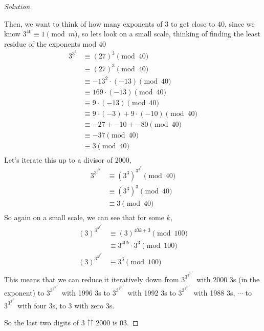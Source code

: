 \documentclass[11pt]{article}
\newenvironment{solution}
  {\renewcommand\qedsymbol{$~$}\begin{proof}[Solution]$ $\par\nobreak\ignorespaces}
  {\end{proof}}
\begin{document}
\begin{solution}
    Then, we want to think of how many exponents of 3 to get close to 40, since we know $3^{40} \equiv 1 \pmod{m}$, so lets look on a small scale, thinking of finding the least residue of the exponents mod 40
    \begin{align*}
        3^{3^3} & \equiv (27)^3 \pmod{40}                        \\
                & \equiv (27)^3 \pmod{40}                        \\
                & \equiv -13^2 \cdot (-13 )\pmod{40}             \\
                & \equiv 169 \cdot (-13) \pmod{40}               \\
                & \equiv 9 \cdot( -13) \pmod{40}                 \\
                & \equiv 9 \cdot (-3) + 9 \cdot (-10) \pmod {40} \\
                & \equiv -27 + -10 + -80 \pmod{40}               \\
                & \equiv -37 \pmod{40}                           \\
                & \equiv 3 \pmod{40}                             \\
    \end{align*}
    Let's iterate this up to a divisor of 2000,
    \begin{align*}
        3^{3^{3^{3^{3}}}} & \equiv (3^3)^{3^{3^3}} \pmod{40} \\
                          & \equiv (3^3)^3 \pmod{40}         \\
                          & \equiv 3 \pmod{40}               \\
    \end{align*}
    So again on a small scale, we can see that for some $k$,
    \begin{align*}
        (3)^{3^{3^{3^{3^3}}}} & \equiv (3)^{40k + 3} \pmod{100}     \\
                              & \equiv 3^{40k} \cdot 3^3 \pmod{100} \\
        (3)^{3^{3^{3^{3^3}}}} & \equiv 3^{3} \pmod{100}             \\
    \end{align*}
    This means that we can reduce it iteratively down from $ 3^{3^{3^{3^{{...}^{3^{3}}}}}}$ with 2000 3s (in the exponent) to $ 3^{3^{3^{3^{{...}^{3^{3}}}}}}$ with 1996 3s to $ 3^{3^{3^{3^{{...}^{3^{3}}}}}}$ with 1992 3s to $ 3^{3^{3^{3^{{...}^{3^{3}}}}}}$ with 1988 3s, $\cdots$ to $ 3^{3^{3^{3^{3}}}}$ with four 3s, to $3$ with zero 3s.

    So the last two digits of $3\upuparrows2000$ is 03.
\end{solution}
\end{document}
